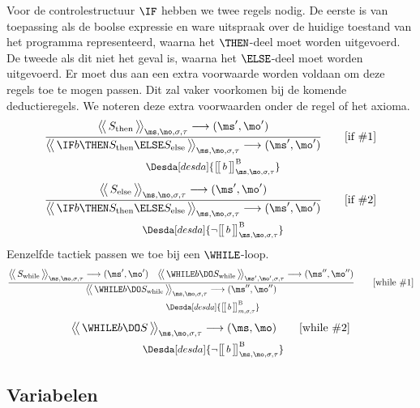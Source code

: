 Voor de controlestructuur $\IF$ hebben we twee regels nodig. De eerste is van toepassing als de boolse expressie en ware uitspraak over de huidige toestand van het programma representeerd, waarna het $\THEN$-deel moet worden uitgevoerd. De tweede als dit niet het geval is, waarna het $\ELSE$-deel moet worden uitgevoerd. Er moet dus aan een extra voorwaarde worden voldaan om deze regels toe te mogen passen. Dit zal vaker voorkomen bij de komende deductieregels. We noteren deze extra voorwaarden onder de regel of het axioma.
%
\begin{gather*}
  \frac{
    \Config{S_\text{then}}{\ms, \mo, \sigma, \tau}
    \longrightarrow
    (\ms', \mo')
  }{
    \Config{\IF b \THEN  S_\text{then} \ELSE S_\text{else} }{\ms, \mo, \sigma, \tau}
    \longrightarrow
    (\ms', \mo')
  }
  \tag*{[if \#1]} \\
  \Desdas{
    \Desda[desda]{\Express[B]{b}{\ms, \mo,\sigma,\tau}}
  }
\end{gather*}
%
\begin{gather*}
  \frac{
    \Config{S_\text{else}}{\ms, \mo, \sigma, \tau}
    \longrightarrow
    (\ms', \mo')
  }{
    \Config{\IF b \THEN  S_\text{then} \ELSE S_\text{else} }{\ms, \mo, \sigma, \tau}
    \longrightarrow
    (\ms', \mo')
  }
  \tag*{[if \#2]} \\
  \Desdas{
    \Desda[desda]{\neg \Express[B]{b}{\ms, \mo,\sigma,\tau}}
  }
\end{gather*}
%
Eenzelfde tactiek passen we toe bij een $\WHILE$-loop.
%
\begin{gather*}
  \frac{
    \Config{S_\text{while}}{\ms, \mo, \sigma, \tau}
    \longrightarrow
    (\ms',\mo')
  \quad
    \Config{\WHILE b \DO S_\text{while} }{\ms', \mo', \sigma, \tau}
    \longrightarrow
    (\ms'',\mo'')
  }{
    \Config{\WHILE b \DO S_\text{while} }{\ms, \mo, \sigma, \tau}
    \longrightarrow
    (\ms'',\mo'')
  }
  \tag*{[while \#1]} \\
  \Desdas{
    \Desda[desda]{\Express[B]{b}{m,\sigma,\tau}}
  }
\end{gather*}
%
\begin{gather*}
  \Config{\WHILE b \DO S }{\ms, \mo, \sigma, \tau}
  \longrightarrow
  (\ms, \mo)
  \tag*{[while \#2]} \\
  \Desdas{
    \Desda[desda]{\neg \Express[B]{b}{\ms,\mo,\sigma,\tau}}
  }
\end{gather*}

\subsection{Variabelen}

